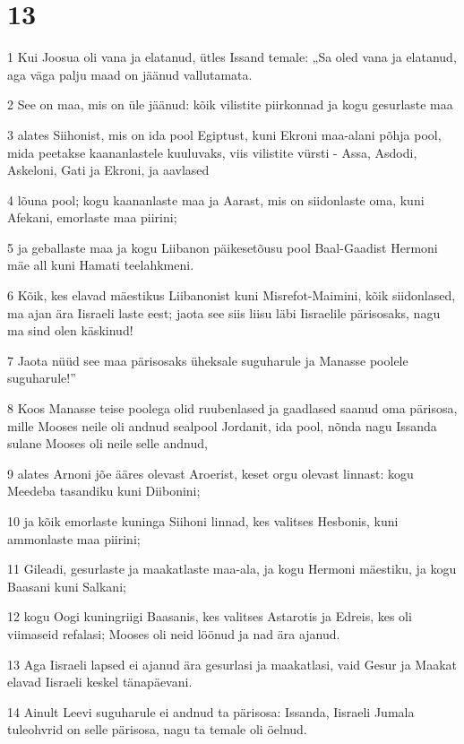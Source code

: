 \chapter{13}

\par 1 Kui Joosua oli vana ja elatanud, ütles Issand temale: „Sa oled vana ja elatanud, aga väga palju maad on jäänud vallutamata.
\par 2 See on maa, mis on üle jäänud: kõik vilistite piirkonnad ja kogu gesurlaste maa
\par 3 alates Siihonist, mis on ida pool Egiptust, kuni Ekroni maa-alani põhja pool, mida peetakse kaananlastele kuuluvaks, viis vilistite vürsti - Assa, Asdodi, Askeloni, Gati ja Ekroni, ja aavlased
\par 4 lõuna pool; kogu kaananlaste maa ja Aarast, mis on siidonlaste oma, kuni Afekani, emorlaste maa piirini;
\par 5 ja geballaste maa ja kogu Liibanon päikesetõusu pool Baal-Gaadist Hermoni mäe all kuni Hamati teelahkmeni.
\par 6 Kõik, kes elavad mäestikus Liibanonist kuni Misrefot-Maimini, kõik siidonlased, ma ajan ära Iisraeli laste eest; jaota see siis liisu läbi Iisraelile pärisosaks, nagu ma sind olen käskinud!
\par 7 Jaota nüüd see maa pärisosaks üheksale suguharule ja Manasse poolele suguharule!”
\par 8 Koos Manasse teise poolega olid ruubenlased ja gaadlased saanud oma pärisosa, mille Mooses neile oli andnud sealpool Jordanit, ida pool, nõnda nagu Issanda sulane Mooses oli neile selle andnud,
\par 9 alates Arnoni jõe ääres olevast Aroerist, keset orgu olevast linnast: kogu Meedeba tasandiku kuni Diibonini;
\par 10 ja kõik emorlaste kuninga Siihoni linnad, kes valitses Hesbonis, kuni ammonlaste maa piirini;
\par 11 Gileadi, gesurlaste ja maakatlaste maa-ala, ja kogu Hermoni mäestiku, ja kogu Baasani kuni Salkani;
\par 12 kogu Oogi kuningriigi Baasanis, kes valitses Astarotis ja Edreis, kes oli viimaseid refalasi; Mooses oli neid löönud ja nad ära ajanud.
\par 13 Aga Iisraeli lapsed ei ajanud ära gesurlasi ja maakatlasi, vaid Gesur ja Maakat elavad Iisraeli keskel tänapäevani.
\par 14 Ainult Leevi suguharule ei andnud ta pärisosa: Issanda, Iisraeli Jumala tuleohvrid on selle pärisosa, nagu ta temale oli öelnud.
